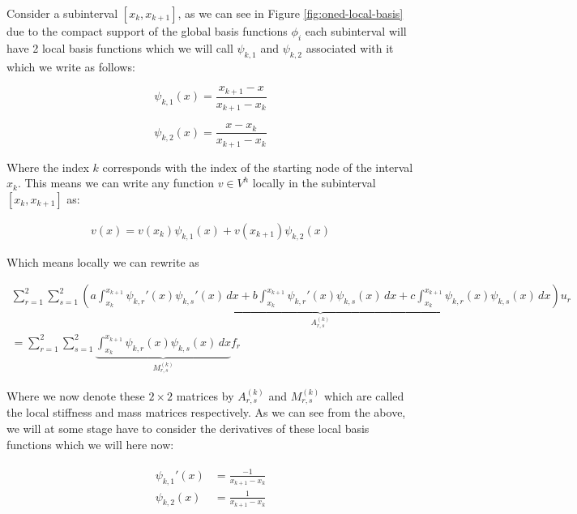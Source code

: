 Consider a subinterval $[x_k, x_{k+1}]$, as we can see in Figure
\ref{fig:oned-local-basis} due to the compact support of the global basis
functions $\phi_i$ each subinterval will have 2 local basis functions which we
will call $\psi_{k,1}$ and $\psi_{k,2}$ associated with it which we write as
follows:

\begin{equation}
    \psi_{k,1}(x) = \frac{x_{k+1} - x}{x_{k+1} - x_k}
\end{equation}

\begin{equation}
    \psi_{k,2}(x) = \frac{x - x_k}{x_{k+1} - x_k}
\end{equation}

Where the index $k$ corresponds with the index of the starting node of the
interval $x_k$.  This means we can write any function $v \in V^h$ locally in
the subinterval $[x_k, x_{k+1}]$ as:

\begin{align*}
    v(x) = v(x_k)\psi_{k,1}(x) + v(x_{k+1})\psi_{k,2}(x)
\end{align*}

Which means locally we can rewrite  as

\begin{equation}\label{eq:oned-deterministic-local-discrete}
  \begin{split}
    \sum_{r = 1}^2\sum_{s = 1}^2\underbrace{\left(
          a\int_{x_k}^{x_{k+1}}\psi_{k,r}'(x)\psi_{k,s}'(x)\, dx
        + b\int_{x_k}^{x_{k+1}}\psi_{k,r}'(x)\psi_{k,s}(x)\, dx
        + c\int_{x_k}^{x_{k+1}}\psi_{k,r}(x)\psi_{k,s}(x)\, dx
    \right)}_{A^{(k)}_{r,s}}u_r  \\
    = \sum_{r= 1}^2\sum_{s = 1}^2\underbrace{
            \int_{x_k}^{x_{k+1}}{\psi_{k,r}(x)\psi_{k,s}(x)}\, dx}_{M^{(k)}_{r,s}}f_r
  \end{split}
\end{equation}

Where we now denote these $2 \times 2$ matrices by $A^{(k)}_{r,s}$ and
$M^{(k)}_{r,s}$ which are called the local stiffness and mass matrices
respectively. As we can see from the above, we will at some stage have
to consider the derivatives of these local basis functions which we will
here now:

\begin{align}
  \begin{split}
    \psi_{k,1}'(x) &= \frac{-1}{x_{k+1} - x_{k}} \\
    \psi_{k,2}(x) &= \frac{1}{x_{k+1} - x_{k}}
  \end{split}
\end{align}

